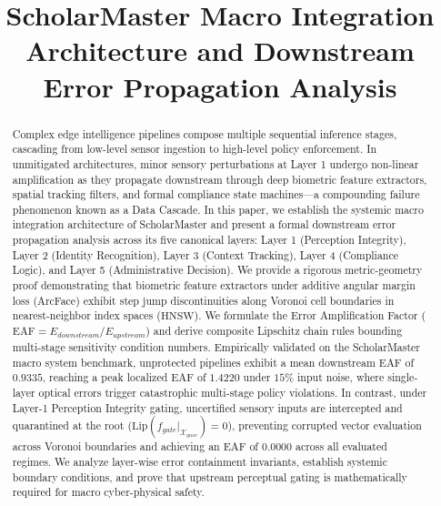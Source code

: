 \documentclass[conference]{IEEEtran}
\begin{document}
\title{ScholarMaster Macro Integration Architecture and Downstream Error Propagation Analysis}

\author{
}

\maketitle

\begin{abstract}
Complex edge intelligence pipelines compose multiple sequential inference stages, cascading from low-level sensor ingestion to high-level policy enforcement. In unmitigated architectures, minor sensory perturbations at Layer 1 undergo non-linear amplification as they propagate downstream through deep biometric feature extractors, spatial tracking filters, and formal compliance state machines---a compounding failure phenomenon known as a Data Cascade. In this paper, we establish the systemic macro integration architecture of ScholarMaster and present a formal downstream error propagation analysis across its five canonical layers: Layer 1 (Perception Integrity), Layer 2 (Identity Recognition), Layer 3 (Context Tracking), Layer 4 (Compliance Logic), and Layer 5 (Administrative Decision). We provide a rigorous metric-geometry proof demonstrating that biometric feature extractors under additive angular margin loss (ArcFace) exhibit step jump discontinuities along Voronoi cell boundaries in nearest-neighbor index spaces ($\text{HNSW}$). We formulate the Error Amplification Factor ($\text{EAF} = E_{downstream} / E_{upstream}$) and derive composite Lipschitz chain rules bounding multi-stage sensitivity condition numbers. Empirically validated on the ScholarMaster macro system benchmark, unprotected pipelines exhibit a mean downstream $\text{EAF}$ of $0.9335$, reaching a peak localized $\text{EAF}$ of $1.4220$ under $15\%$ input noise, where single-layer optical errors trigger catastrophic multi-stage policy violations. In contrast, under Layer-1 Perception Integrity gating, uncertified sensory inputs are intercepted and quarantined at the root ($\mathrm{Lip}(f_{gate}|_{\mathcal{X}_{quar}}) = 0$), preventing corrupted vector evaluation across Voronoi boundaries and achieving an $\text{EAF}$ of $0.0000$ across all evaluated regimes. We analyze layer-wise error containment invariants, establish systemic boundary conditions, and prove that upstream perceptual gating is mathematically required for macro cyber-physical safety.
\end{abstract}
\end{document}
